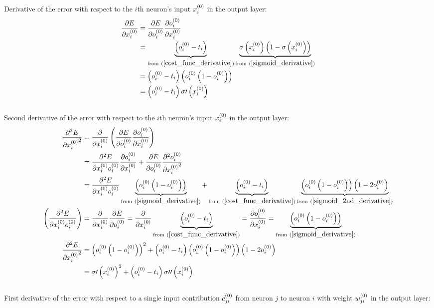 \\[5pt]Derivative of the error with respect to the $i$th neuron's input $x_{i}^{(0)}$ in the output layer:
\begin{align}
\pdv{E}{\Input i 0} &= \pdv{E}{\Out i 0} \pdv{\Out i 0}{\Input i 0} 
\\
&= \underbrace{\left(\Out i 0 - \Target i\right)}_{\text{from} \ (\ref{cost_func_derivative})} \underbrace{\sigma\left(\Input i 0\right)\left(1 - \sigma\left(\Input i 0\right)\right)}
_{\text{from} \ (\ref{sigmoid_derivative})}
\\
&= \left(\Out i 0 - \Target i\right)\left(\Out i 0 \left(1 - \Out i 0\right)\right)
\\
&= \left(\Out i 0 - \Target i\right)\sigma\prime\left(\Input i 0\right)\label{dedx}
\end{align}
\\[5pt]Second derivative of the error with respect to the $i$th neuron's input $x_{i}^{(0)}$ in the output layer:
\begin{align}
\pdv[2]{E}{{\Input i 0}} &= \pdv{}{\Input i 0}
\left(\pdv{E}{\Out i 0}\pdv{\Out i 0}{\Input i 0}\right) 
\\
&= \pdv{{^2}E}{{\Input i 0}{\Out i 0}}\pdv{\Out i 0}{\Input i 0} + \pdv{E}{\Out i 0}\pdv[2]{\Out i 0}{{\Input i 0}}
\\
&= \pdv{{^2}E}{{\Input i 0}{\Out i 0}}\underbrace{\left(\Out i 0 \left(1 - \Out i 0\right)\right)}_{{\text{from} \ (\ref{sigmoid_derivative})}} + \underbrace{\left(\Out i 0 - \Target i\right)}_{\text{from} \ (\ref{cost_func_derivative})}\underbrace{\left(\Out i 0 \left(1 - \Out i 0\right)\right)\left(1 - 2\Out i 0\right) }_{\text{from}\ (\ref{sigmoid_2nd_derivative})}
\\
\left(\pdv{{^2}E}{{\Input i 0}{\Out i 0}}\right) &= \pdv{}{\Input i 0}\pdv{E}{\Out i 0} = \pdv{}{\Input i 0}\underbrace{\left(\Out i 0 - \Target i\right)}_{\text{from} \ (\ref{cost_func_derivative})} = \pdv{\Out i 0}{\Input i 0} = \underbrace{\left(\Out i 0 \left(1 - \Out i 0\right)\right)}_{{\text{from} \ (\ref{sigmoid_derivative})}} 
\\
\pdv[2]{E}{{\Input i 0}}&= \left(\Out i 0 \left(1 - \Out i 0\right)\right)^2 + \left(\Out i 0 - \Target i\right)\left(\Out i 0 \left(1 - \Out i 0\right)\right)\left(1 - 2\Out i 0\right) 
\\
&= \sigma\prime\left(\Input i 0\right)^2 + \left(\Out i 0 - \Target i\right)\sigma\prime\prime\left(\Input i 0\right)\label{d2edx2}
\end{align}
\\[5pt]First derivative of the error with respect to a single input contribution $c_{ji}^{(0)}$ from neuron $j$ to neuron $i$ with weight $w_{ji}^{(0)}$ in the output layer:

